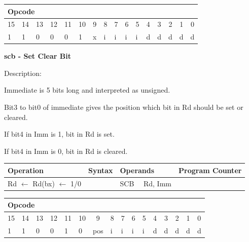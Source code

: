 \documentclass[%
	pdftex,
	a4paper,
	oneside,
	bibtotoc,%
	idxtotoc,%
	bibtotocnumbered,
	halfparskip,%
]{scrbook}
\begin{document}
\begin{tabular}{|c|c|c|c|c|c|c|c|c|c|c|c|c|c|c|c|}
\hline
\multicolumn{6}{|l|}{Opcode} & \multicolumn{5}{|l|}{} & \multicolumn{5}{|l|}{
} \\ \hline
15 & 14 & 13 & 12 & 11 & 10 & 9 & 8 & 7 & 6 & 5 & 4 & 3 & 2 & 1 & 0 \\ \hline
\multicolumn{1}{|l|}{1} & \multicolumn{1}{|l|}{1} & \multicolumn{1}{|l|}{0}
& \multicolumn{1}{|l|}{0} & \multicolumn{1}{|l|}{0} & \multicolumn{1}{|l|}{1}
& \multicolumn{1}{|l|}{x} & \multicolumn{1}{|l|}{i} & \multicolumn{1}{|l|}{i}
& \multicolumn{1}{|l|}{i} & \multicolumn{1}{|l|}{i} & \multicolumn{1}{|l|}{d}
& \multicolumn{1}{|l|}{d} & \multicolumn{1}{|l|}{d} & \multicolumn{1}{|l|}{d}
& \multicolumn{1}{|l|}{d} \\ \hline
\end{tabular}

\bigskip

\textbf{scb - Set Clear Bit}

Description:

Immediate is 5 bits long and interpreted as unsigned.

Bit3 to bit0 of immediate gives the position which bit in Rd should be set
or cleared.

If bit4 in Imm is 1, bit in Rd is set.

If bit4 in Imm is 0, bit in Rd is cleared.

\begin{tabular}{|l|l|l|l|}
\hline
Operation & Syntax & Operands & Program Counter \\ \hline
Rd $\leftarrow $ Rd(bx) $\leftarrow $ 1/0 &  & SCB \ \ Rd, Imm &  \\ \hline
\end{tabular}

\begin{tabular}{|c|c|c|c|c|c|c|c|c|c|c|c|c|c|c|c|}
\hline
\multicolumn{6}{|l|}{Opcode} & \multicolumn{5}{|l|}{} & \multicolumn{5}{|l|}{
} \\ \hline
15 & 14 & 13 & 12 & 11 & 10 & 9 & 8 & 7 & 6 & 5 & 4 & 3 & 2 & 1 & 0 \\ \hline
\multicolumn{1}{|l|}{1} & \multicolumn{1}{|l|}{1} & \multicolumn{1}{|l|}{0}
& \multicolumn{1}{|l|}{0} & \multicolumn{1}{|l|}{1} & \multicolumn{1}{|l|}{0}
& \multicolumn{1}{|l|}{pos} & \multicolumn{1}{|l|}{i} & \multicolumn{1}{|l|}{
i} & \multicolumn{1}{|l|}{i} & \multicolumn{1}{|l|}{i} & 
\multicolumn{1}{|l|}{d} & \multicolumn{1}{|l|}{d} & \multicolumn{1}{|l|}{d}
& \multicolumn{1}{|l|}{d} & \multicolumn{1}{|l|}{d} \\ \hline
\end{tabular}
\end{document}
